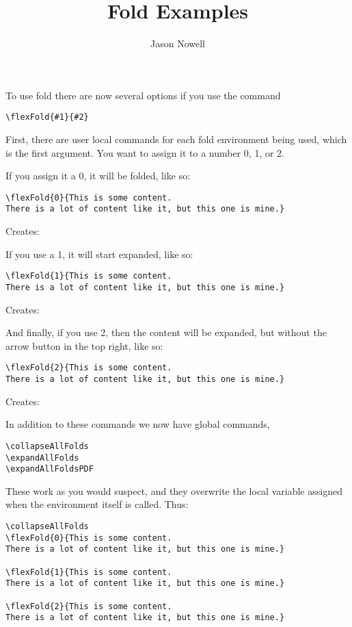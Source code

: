 \documentclass{ximera}
\title{Fold Examples}
\author{Jason Nowell}
\begin{document}
\maketitle


To use fold there are now several options if you use the command 

\begin{verbatim}
\flexFold{#1}{#2}
\end{verbatim}

First, there are user local commands for each fold environment being used, which is the first argument. You want to assign it to a number 0, 1, or 2.

If you assign it a 0, it will be folded, like so:
\begin{verbatim}
\flexFold{0}{This is some content. 
There is a lot of content like it, but this one is mine.}
\end{verbatim}

Creates:

If you use a 1, it will start expanded, like so:

\begin{verbatim}
\flexFold{1}{This is some content. 
There is a lot of content like it, but this one is mine.}
\end{verbatim}

Creates:

And finally, if you use 2, then the content will be expanded, but without the arrow button in the top right, like so:
\begin{verbatim}
\flexFold{2}{This is some content. 
There is a lot of content like it, but this one is mine.}
\end{verbatim}

Creates:

In addition to these commands we now have global commands,
\begin{verbatim}
\collapseAllFolds
\expandAllFolds
\expandAllFoldsPDF
\end{verbatim}

These work as you would suspect, and they overwrite the local variable assigned when the environment itself is called. Thus:

\begin{verbatim}
\collapseAllFolds
\flexFold{0}{This is some content. 
There is a lot of content like it, but this one is mine.}

\flexFold{1}{This is some content. 
There is a lot of content like it, but this one is mine.}

\flexFold{2}{This is some content. 
There is a lot of content like it, but this one is mine.}
\end{verbatim}
\end{document}
